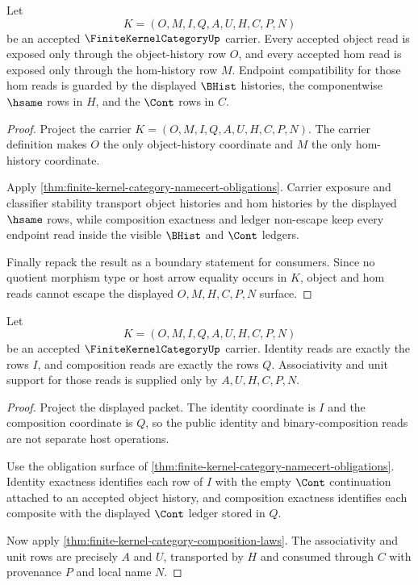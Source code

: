 \begin{theorem}
\label{thm:finite-kernel-category-object-hom-boundary}
Let
$$
K=(O,M,I,Q,A,U,H,C,P,N)
$$
be an accepted $\FiniteKernelCategoryUp$ carrier. Every accepted object read is exposed only through the object-history row $O$, and every accepted hom read is exposed only through the hom-history row $M$. Endpoint compatibility for those hom reads is guarded by the displayed $\BHist$ histories, the componentwise $\hsame$ rows in $H$, and the $\Cont$ rows in $C$.
\end{theorem}
\begin{proof}
Project the carrier $K=(O,M,I,Q,A,U,H,C,P,N)$. The carrier definition makes $O$ the only object-history coordinate and $M$ the only hom-history coordinate.

Apply \autoref{thm:finite-kernel-category-namecert-obligations}. Carrier exposure and classifier stability transport object histories and hom histories by the displayed $\hsame$ rows, while composition exactness and ledger non-escape keep every endpoint read inside the visible $\BHist$ and $\Cont$ ledgers.

Finally repack the result as a boundary statement for consumers. Since no quotient morphism type or host arrow equality occurs in $K$, object and hom reads cannot escape the displayed $O,M,H,C,P,N$ surface.
\end{proof}

\begin{theorem}
\label{thm:finite-kernel-category-identity-composition-boundary}
Let
$$
K=(O,M,I,Q,A,U,H,C,P,N)
$$
be an accepted $\FiniteKernelCategoryUp$ carrier. Identity reads are exactly the rows $I$, and composition reads are exactly the rows $Q$. Associativity and unit support for those reads is supplied only by $A,U,H,C,P,N$.
\end{theorem}
\begin{proof}
Project the displayed packet. The identity coordinate is $I$ and the composition coordinate is $Q$, so the public identity and binary-composition reads are not separate host operations.

Use the obligation surface of \autoref{thm:finite-kernel-category-namecert-obligations}. Identity exactness identifies each row of $I$ with the empty $\Cont$ continuation attached to an accepted object history, and composition exactness identifies each composite with the displayed $\Cont$ ledger stored in $Q$.

Now apply \autoref{thm:finite-kernel-category-composition-laws}. The associativity and unit rows are precisely $A$ and $U$, transported by $H$ and consumed through $C$ with provenance $P$ and local name $N$.
\end{proof}

